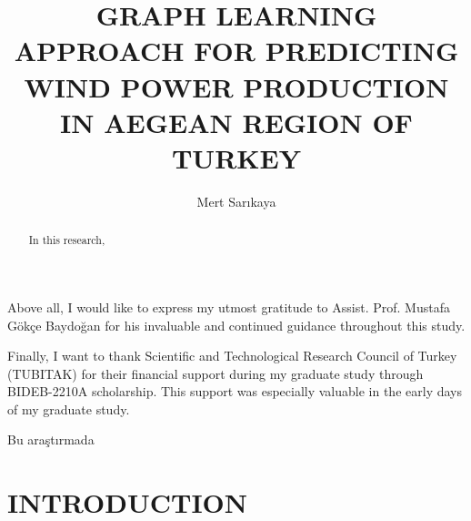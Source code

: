 \documentclass[a4paper,onesided,12pt]{report}
\title{GRAPH LEARNING APPROACH FOR PREDICTING WIND POWER PRODUCTION IN AEGEAN REGION OF TURKEY}
\author{Mert Sarıkaya}
\begin{document}
\makemstitle %
\makeapprovalpage

\begin{acknowledgements}

Above all, I would like to express my utmost gratitude to Assist. Prof. Mustafa Gökçe Baydoğan for his invaluable and continued guidance throughout this study.

Finally, I want to thank Scientific and Technological Research Council of Turkey (TUBITAK) for their financial support during my graduate study through BIDEB-2210A scholarship. This support was especially valuable in the early days of my graduate study.

\end{acknowledgements}

\begin{abstract}

In this research, 

\end{abstract}

\begin{ozet}

Bu araştırmada

\end{ozet}

\tableofcontents
\listoffigures
\listoftables

\begin{symbols}
%
\sym{}{}
\end{symbols}

\begin{abbreviations}

\end{abbreviations}

\chapter{INTRODUCTION}
\label{chapter:introduction}
\end{document}
